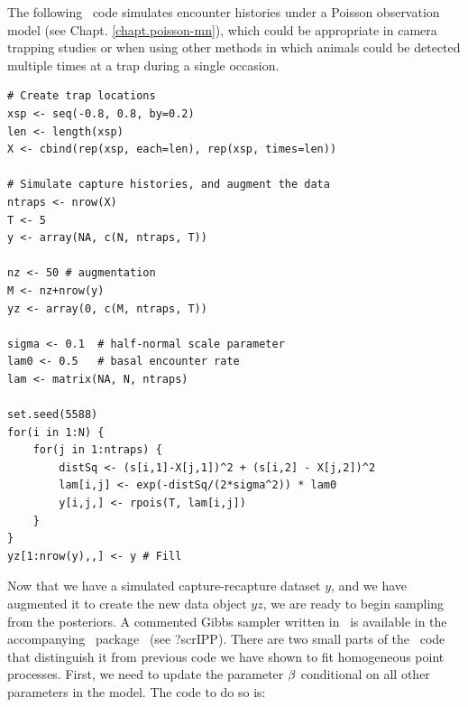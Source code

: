 The following \R~code simulates encounter histories under a
Poisson observation model (see Chapt. \ref{chapt.poisson-mn}), which could be appropriate in camera
trapping studies or when using other methods in which animals could
be detected multiple times at a trap during a single occasion.

\begin{small}
\begin{verbatim}
# Create trap locations
xsp <- seq(-0.8, 0.8, by=0.2)
len <- length(xsp)
X <- cbind(rep(xsp, each=len), rep(xsp, times=len))

# Simulate capture histories, and augment the data
ntraps <- nrow(X)
T <- 5
y <- array(NA, c(N, ntraps, T))

nz <- 50 # augmentation
M <- nz+nrow(y)
yz <- array(0, c(M, ntraps, T))

sigma <- 0.1  # half-normal scale parameter
lam0 <- 0.5   # basal encounter rate
lam <- matrix(NA, N, ntraps)

set.seed(5588)
for(i in 1:N) {
    for(j in 1:ntraps) {
        distSq <- (s[i,1]-X[j,1])^2 + (s[i,2] - X[j,2])^2
        lam[i,j] <- exp(-distSq/(2*sigma^2)) * lam0
        y[i,j,] <- rpois(T, lam[i,j])
    }
}
yz[1:nrow(y),,] <- y # Fill
\end{verbatim}
\end{small}

Now that we have a simulated capture-recapture dataset $y$, and we have
augmented it to create the new data object $yz$, we are ready to
begin sampling from the posteriors. A commented Gibbs sampler written
in \R~is available in the accompanying \R~package \scrbook~(see
?scrIPP). There are two small parts of the
\R~code that distinguish it from previous code we have shown to
fit homogeneous point processes. First, we need to update the parameter
${\bf \beta}$ conditional on all other parameters in the model. The code to
do so is: 

